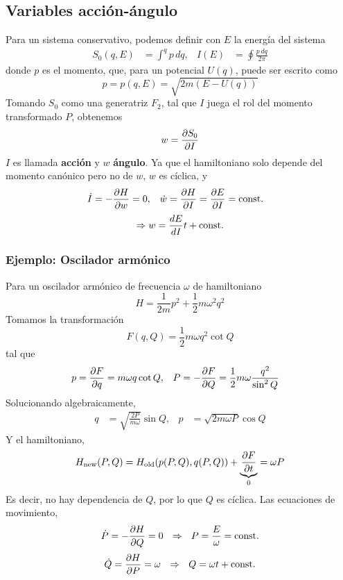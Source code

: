 \documentclass[]{article}
\numberwithin{equation}{section}
\begin{document}
\subsection{Variables acción-ángulo}
Para un sistema conservativo, podemos definir con $E$ la energía del sistema
\begin{align}
	S_0(q,E) &= \int^{q} p \, dq, & I(E) &= \oint \frac{p \, dq}{2\pi}
\end{align}
donde $p$ es el momento, que, para un potencial $U(q)$, puede ser escrito como
\begin{equation}
	p = p(q,E) = \sqrt{2m (E - U(q))}
\end{equation}
Tomando $S_0$ como una generatriz $F_2$, tal que $I$ juega el rol del momento transformado $P$, obtenemos
\begin{equation}
	w = \dfrac{\partial S_0}{\partial I}
\end{equation}
$I$ es llamada \textbf{acción} y $w$ \textbf{ángulo}. Ya que el hamiltoniano solo depende del momento canónico pero no de $w$, $w$ es cíclica, y
\begin{align}
	\dot{I} &= -\dfrac{\partial H}{\partial w} = 0, & \dot{w} &= \dfrac{\partial H}{\partial I} = \dfrac{\partial E}{\partial I} = \mathrm{const.}
\end{align}
\begin{equation}
	\Rightarrow w = \dfrac{d E}{d I} t + \mathrm{const.}
\end{equation}

\subsubsection{Ejemplo: Oscilador armónico}
Para un oscilador armónico de frecuencia $\omega$ de hamiltoniano
\begin{equation*}
	H = \frac{1}{2m}p^2 + \frac{1}{2} m \omega^2 q^2
\end{equation*}
Tomamos la transformación
\begin{equation*}
	F(q,Q) = \frac{1}{2}m \omega q^2 \cot Q
\end{equation*}
tal que
\begin{align*}
	p &= \dfrac{\partial F}{\partial q} = m \omega q \cot Q, & P &= -\dfrac{\partial F}{\partial Q} = \frac{1}{2}m\omega \frac{q^2}{\sin^2 Q	}
\end{align*}
Solucionando algebraicamente, 
\begin{align*}
	q &= \sqrt{\frac{2P}{m\omega}} \sin Q, & p &= \sqrt{2 m \omega P} \cos Q
\end{align*}
Y el hamiltoniano,
\begin{equation*}
	H_\mathrm{new}(P,Q) = H_\mathrm{old}(p(P,Q), q(P,Q)) + \underbrace{\dfrac{\partial F}{\partial t}}_0 = \omega P
\end{equation*}
Es decir, no hay dependencia de $Q$, por lo que $Q$ es cíclica. Las ecuaciones de movimiento,
\begin{equation*}
	\dot{P} = -\dfrac{\partial H}{\partial Q} = 0 ~~\Rightarrow~~ P = \frac{E}{\omega} = \mathrm{const.}
\end{equation*}
\begin{equation*}
	\dot{Q} = \dfrac{\partial H}{\partial P} = \omega ~~\Rightarrow~~ Q = \omega t + \mathrm{const.}
\end{equation*}
\end{document}
